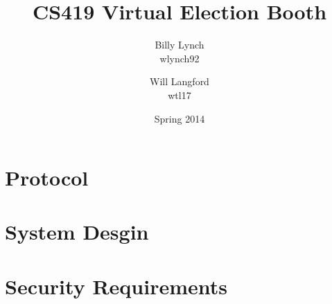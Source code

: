 \documentclass[12pt]{article}
\title{CS419 Virtual Election Booth}
\author{Billy Lynch \\ wlynch92 \and Will Langford \\ wtl17}
\date{Spring 2014}
\begin{document}
\maketitle

\section{Protocol}

\section{System Desgin}

\section{Security Requirements}
\end{document}
